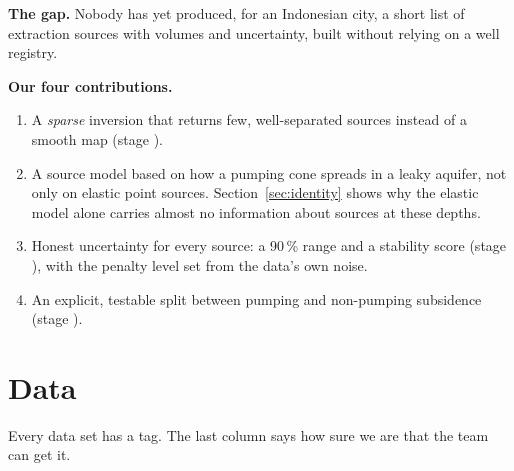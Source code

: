 \textbf{The gap.} Nobody has yet produced, for an Indonesian city, a short list of extraction sources
with volumes and uncertainty, built without relying on a well registry.

\textbf{Our four contributions.}
\begin{enumerate}
\item A \emph{sparse} inversion that returns few, well-separated sources instead of a smooth map
      (stage ).
\item A source model based on how a pumping cone spreads in a leaky aquifer, not only on elastic
      point sources. Section~\ref{sec:identity} shows why the elastic model alone carries almost no
      information about sources at these depths.
\item Honest uncertainty for every source: a 90\,\% range and a stability score (stage ), with the
      penalty level set from the data's own noise.
\item An explicit, testable split between pumping and non-pumping subsidence (stage ).
\end{enumerate}

\section{Data}\label{sec:data}

Every data set has a tag. The last column says how sure we are that the team can get it.

